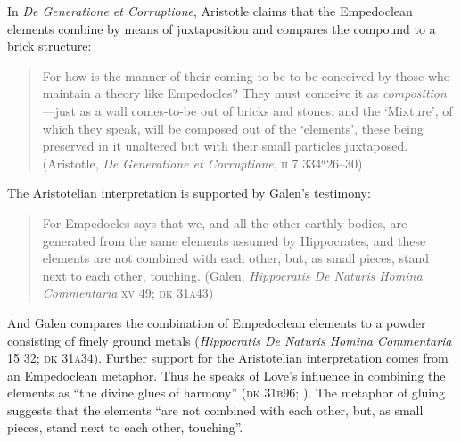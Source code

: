 In \emph{De Generatione et Corruptione}, Aristotle claims that the Empedoclean elements combine by means of juxtaposition and compares the compound to a brick structure:
\begin{quote}
    For how is the manner of their coming-to-be to be conceived by those who maintain a theory like Empedocles? They must conceive it as \emph{composition}---just as a wall comes-to-be out of bricks and stones: and the `Mixture', of which they speak, will be composed out of the `elements', these being preserved in it unaltered but with their small particles juxtaposed. (Aristotle, \emph{De Generatione et Corruptione}, \textsc{ii} 7 334\( ^{a} \)26--30)
\end{quote}
The Aristotelian interpretation is supported by Galen's testimony:
\begin{quote}
     For Empedocles says that we, and all the other earthly bodies, are generated from the same elements assumed by Hippocrates, and these elements are not combined with each other, but, as small pieces, stand next to each other, touching. (Galen, \emph{Hippocratis De Naturis Homina Commentaria} \textsc{xv} 49; \textsc{dk} 31\textsc{a}43)
\end{quote}
And Galen compares the combination of Empedoclean elements to a powder consisting of finely ground metals (\emph{Hippocratis De Naturis Homina Commentaria} 15 32; \textsc{dk} 31\textsc{a}34). Further support for the Aristotelian interpretation comes from an Empedoclean metaphor. Thus he speaks of Love's influence in combining the elements as ``the divine glues of harmony'' (\textsc{dk} 31\textsc{b}96; \citealt[62 245]{Inwood:2001ve}). The metaphor of gluing suggests that the elements ``are not combined with each other, but, as small pieces, stand next to each other, touching''.

